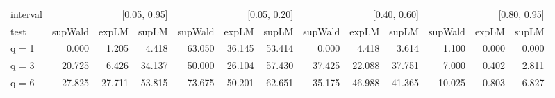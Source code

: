 \begin{tabular}{lrrrrrrrrrrrr}
\toprule
interval & \multicolumn{3}{r}{[0.05, 0.95]} & \multicolumn{3}{r}{[0.05, 0.20]} & \multicolumn{3}{r}{[0.40, 0.60]} & \multicolumn{3}{r}{[0.80, 0.95]} \\
test & supWald & expLM & supLM & supWald & expLM & supLM & supWald & expLM & supLM & supWald & expLM & supLM \\
\midrule
q = 1 & 0.000 & 1.205 & 4.418 & 63.050 & 36.145 & 53.414 & 0.000 & 4.418 & 3.614 & 1.100 & 0.000 & 0.000 \\
q = 3 & 20.725 & 6.426 & 34.137 & 50.000 & 26.104 & 57.430 & 37.425 & 22.088 & 37.751 & 7.000 & 0.402 & 2.811 \\
q = 6 & 27.825 & 27.711 & 53.815 & 73.675 & 50.201 & 62.651 & 35.175 & 46.988 & 41.365 & 10.025 & 0.803 & 6.827 \\
\bottomrule
\end{tabular}
